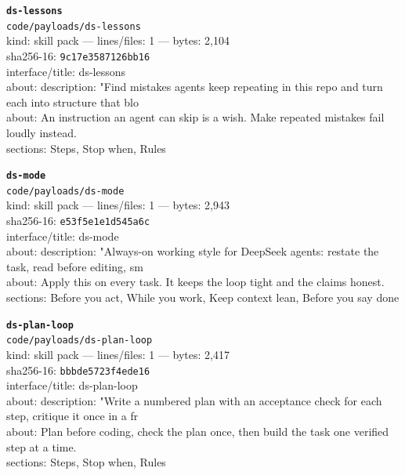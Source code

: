 \noindent\textbf{\texttt{ds-lessons}}\\
\texttt{code/payloads/ds-lessons}\\
kind: skill pack --- lines/files: 1 --- bytes: 2,104\\
sha256-16: \texttt{9c17e3587126bb16}\\
interface/title: ds-lessons\\
about: description: "Find mistakes agents keep repeating in this repo and turn each into structure that blo\\
about: An instruction an agent can skip is a wish. Make repeated mistakes fail loudly instead.\\
sections: Steps, Stop when, Rules\\
\vspace*{6.0pt}

\noindent\textbf{\texttt{ds-mode}}\\
\texttt{code/payloads/ds-mode}\\
kind: skill pack --- lines/files: 1 --- bytes: 2,943\\
sha256-16: \texttt{e53f5e1e1d545a6c}\\
interface/title: ds-mode\\
about: description: "Always-on working style for DeepSeek agents: restate the task, read before editing, sm\\
about: Apply this on every task. It keeps the loop tight and the claims honest.\\
sections: Before you act, While you work, Keep context lean, Before you say done\\
\vspace*{6.0pt}
\newpage

\noindent\textbf{\texttt{ds-plan-loop}}\\
\texttt{code/payloads/ds-plan-loop}\\
kind: skill pack --- lines/files: 1 --- bytes: 2,417\\
sha256-16: \texttt{bbbde5723f4ede16}\\
interface/title: ds-plan-loop\\
about: description: "Write a numbered plan with an acceptance check for each step, critique it once in a fr\\
about: Plan before coding, check the plan once, then build the task one verified step at a time.\\
sections: Steps, Stop when, Rules\\
\vspace*{6.0pt}

